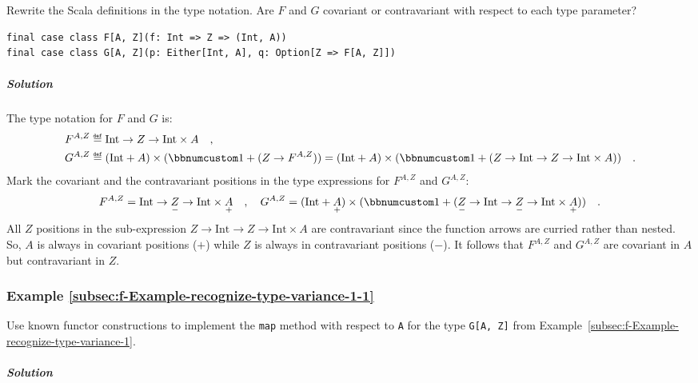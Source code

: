 Rewrite the Scala definitions in the type notation. Are $F$ and $G$
covariant or contravariant with respect to each type parameter?

\begin{lstlisting}
final case class F[A, Z](f: Int => Z => (Int, A))
final case class G[A, Z](p: Either[Int, A], q: Option[Z => F[A, Z]])
\end{lstlisting}


\subparagraph{Solution}

The type notation for $F$ and $G$ is: 
\begin{align*}
 & F^{A,Z}\triangleq\text{Int}\rightarrow Z\rightarrow\text{Int}\times A\quad,\\
 & G^{A,Z}\triangleq(\text{Int}+A)\times(\bbnum 1+(Z\rightarrow F^{A,Z}))=(\text{Int}+A)\times(\bbnum 1+(Z\rightarrow\text{Int}\rightarrow Z\rightarrow\text{Int}\times A))\quad.
\end{align*}
Mark the covariant and the contravariant positions in the type expressions
for $F^{A,Z}$ and $G^{A,Z}$:
\[
F^{A,Z}=\text{Int}\rightarrow\underset{-}{Z}\rightarrow\text{Int}\times\underset{+}{A}\quad,\quad G^{A,Z}=(\text{Int}+\underset{+}{A})\times(\bbnum 1+(\underset{-}{Z}\rightarrow\text{Int}\rightarrow\underset{-}{Z}\rightarrow\text{Int}\times\underset{+}{A}))\quad.
\]
All $Z$ positions in the sub-expression $Z\rightarrow\text{Int}\rightarrow Z\rightarrow\text{Int}\times A$
are contravariant since the function arrows are curried rather than
nested. So, $A$ is always in covariant positions ($+$) while $Z$
is always in contravariant positions ($-$). It follows that $F^{A,Z}$
and $G^{A,Z}$ are covariant in $A$ but contravariant in $Z$. 

\subsubsection{Example \label{subsec:f-Example-recognize-type-variance-1-1}\ref{subsec:f-Example-recognize-type-variance-1-1}}

Use known functor constructions to implement the \lstinline!map!
method with respect to \lstinline!A! for the type \lstinline!G[A, Z]!
from Example~\ref{subsec:f-Example-recognize-type-variance-1}.

\subparagraph{Solution}

